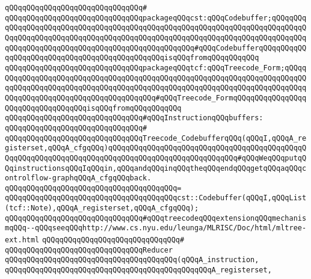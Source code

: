\verb|qQQqqQQqqQQqqQQqqQQqqQQqqQQqqQQq#|\newline
\verb|qQQqqQQqqQQqqQQqqQQqqQQqqQQqqQQqpackageqQQqcst:qQQqCodebuffer;qQQqqQQqqQQqqQQqqQQqqQQqqQQqqQQqqQQqqQQqqQQqqQQqqQQqqQQqqQQqqQQqqQQqqQQqqQQqqQQqqQQqqQQqqQQqqQQqqQQqqQQqqQQqqQQqqQQqqQQqqQQqqQQqqQQqqQQqqQQqqQQqqQQqqQQqqQQqqQQqqQQqqQQqqQQqqQQqqQQqqQQqqQQqqQQq#qQQqCodebufferqQQqqQQqqQQqqQQqqQQqqQQqqQQqqQQqqQQqqQQqqQQqqQQqisqQQqfromqQQqqQQqqQQq|\newline
\verb|qQQqqQQqqQQqqQQqqQQqqQQqqQQqqQQqpackageqQQqtcf:qQQqTreecode_Form;qQQqqQQqqQQqqQQqqQQqqQQqqQQqqQQqqQQqqQQqqQQqqQQqqQQqqQQqqQQqqQQqqQQqqQQqqQQqqQQqqQQqqQQqqQQqqQQqqQQqqQQqqQQqqQQqqQQqqQQqqQQqqQQqqQQqqQQqqQQqqQQqqQQqqQQqqQQqqQQqqQQqqQQqqQQqqQQqqQQq#qQQqTreecode_FormqQQqqQQqqQQqqQQqqQQqqQQqqQQqqQQqqQQqisqQQqfromqQQqqQQqqQQq|\newline
\newline
\verb|qQQqqQQqqQQqqQQqqQQqqQQqqQQqqQQq#qQQqInstructionqQQqbuffers:|\newline
\verb|qQQqqQQqqQQqqQQqqQQqqQQqqQQqqQQq#|\newline
\verb|qQQqqQQqqQQqqQQqqQQqqQQqqQQqqQQqTreecode_CodebufferqQQq(qQQqI,qQQqA_registerset,qQQqA_cfgqQQq)qQQqqQQqqQQqqQQqqQQqqQQqqQQqqQQqqQQqqQQqqQQqqQQqqQQqqQQqqQQqqQQqqQQqqQQqqQQqqQQqqQQqqQQqqQQqqQQqqQQq#qQQqWeqQQqputqQQqinstructionsqQQqIqQQqin,qQQqandqQQqinqQQqtheqQQqendqQQqgetqQQqaqQQqcontrolflow-graphqQQqA_cfgqQQqback.|\newline
\verb|qQQqqQQqqQQqqQQqqQQqqQQqqQQqqQQqqQQqqQQq=|\newline
\verb|qQQqqQQqqQQqqQQqqQQqqQQqqQQqqQQqqQQqqQQqcst::Codebuffer(qQQqI,qQQqList(tcf::Note),qQQqA_registerset,qQQqA_cfgqQQq);|\newline
\newline
\newline
\verb|qQQqqQQqqQQqqQQqqQQqqQQqqQQqqQQq#qQQqtreecodeqQQqextensionqQQqmechanismqQQq--qQQqseeqQQqhttp://www.cs.nyu.edu/leunga/MLRISC/Doc/html/mltree-ext.html|\newline
\verb|qQQqqQQqqQQqqQQqqQQqqQQqqQQqqQQq#|\newline
\verb|qQQqqQQqqQQqqQQqqQQqqQQqqQQqqQQqReducer|\newline
\verb|qQQqqQQqqQQqqQQqqQQqqQQqqQQqqQQqqQQqqQQq(qQQqA_instruction,|\newline
\verb|qQQqqQQqqQQqqQQqqQQqqQQqqQQqqQQqqQQqqQQqqQQqqQQqA_registerset,|\newline
